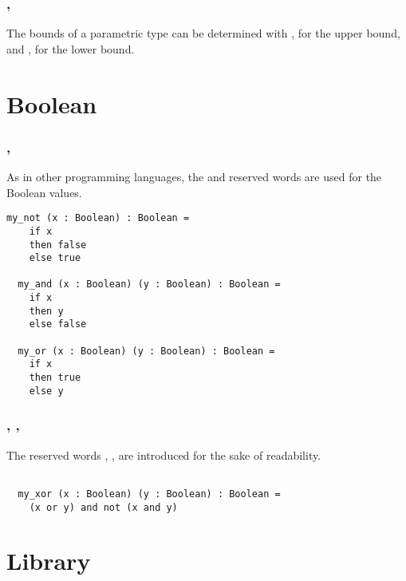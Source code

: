 \subsubsection{\sodasubtype, \sodasupertype}

The bounds of a parametric type can be determined with \sodasubtype, for the upper bound, and \sodasupertype, for the lower bound.


\section{Boolean}

\subsubsection{\sodafalse, \sodatrue}

As in other programming languages, the \sodafalse and \sodatrue reserved words are used for the Boolean values.

\begin{lstlisting}[label={lst:exampleFalseTrue}]
  my_not (x : Boolean) : Boolean =
    if x
    then false
    else true

  my_and (x : Boolean) (y : Boolean) : Boolean =
    if x
    then y
    else false

  my_or (x : Boolean) (y : Boolean) : Boolean =
    if x
    then true
    else y
\end{lstlisting}

\subsubsection{\sodanot, \sodaand, \sodaor}

The reserved words \sodanot, \sodaand, \sodaor are introduced for the sake of readability.

\begin{lstlisting}[label={lst:exampleNotAndOr}]

  my_xor (x : Boolean) (y : Boolean) : Boolean =
    (x or y) and not (x and y)

\end{lstlisting}


\section{Library}

\subsubsection{\sodapackage}

